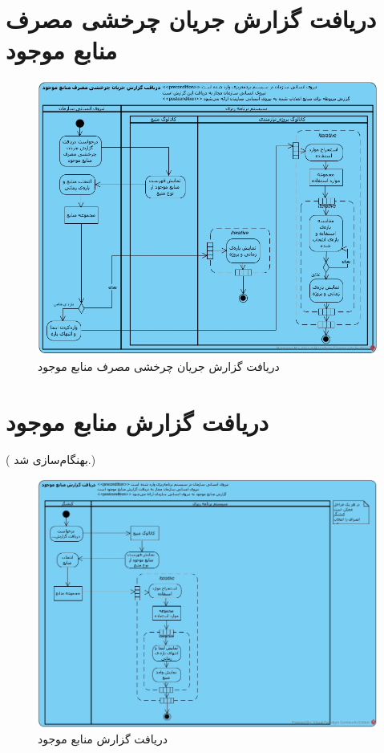 \section{دریافت گزارش جریان چرخشی مصرف منابع موجود}
\begin{figure}[H]
	\centering
	\includegraphics[scale=0.6]{img/activity/UsageFlowReport}
	\caption{دریافت گزارش جریان چرخشی مصرف منابع موجود}
\end{figure}


\newpage
\section{دریافت گزارش منابع موجود}
({\color{red} بهنگام‌سازی شد.})
\begin{figure}[H]
	\centering
	\includegraphics[scale=0.65]{img/activity/AvailableResourcesReport}
	\caption{دریافت گزارش منابع موجود}
\end{figure}


